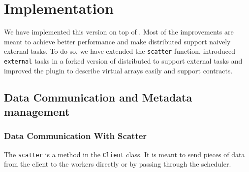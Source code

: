 \section{Implementation}

We have implemented this version on top of \deisa. Most of the improvements are meant to achieve better performance and make \dask distributed support naively external tasks. To do so, we have extended the \texttt{scatter} function, introduced \texttt{external} tasks in a forked version of \dask distributed to support external tasks and improved the \deisa plugin to describe virtual arrays easily and support contracts. 


\subsection{Data Communication and Metadata management}

\subsubsection{Data Communication With Scatter}\label{sec:datacommscatter}

The \texttt{scatter} is a method in the \dask \texttt{Client} class. It is meant to send pieces of data from the client to the workers directly or by passing through the scheduler.

